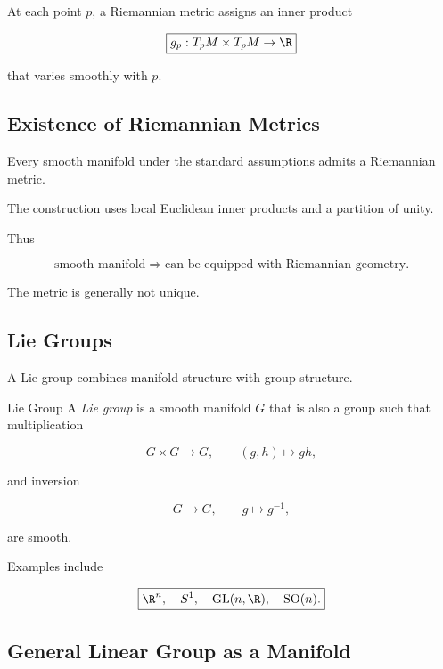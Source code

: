 At each point \(p\), a Riemannian metric assigns an inner product

\[
\boxed{
g_p:T_pM\times T_pM\to\R
}
\]

that varies smoothly with \(p\).

\subsection{Existence of Riemannian Metrics}
\label{subsec:existence-riemannian-metrics}

Every smooth manifold under the standard assumptions admits a Riemannian
metric.

The construction uses local Euclidean inner products and a partition of
unity.

Thus

\[
\boxed{
\text{smooth manifold}
\Longrightarrow
\text{can be equipped with Riemannian geometry}.
}
\]

The metric is generally not unique.

\subsection{Lie Groups}
\label{subsec:lie-groups-manifolds}

A Lie group combines manifold structure with group structure.

\begin{definitionbox}{Lie Group}
A \emph{Lie group} is a smooth manifold \(G\) that is also a group such that
multiplication

\[
\boxed{
G\times G\to G,
\qquad
(g,h)\mapsto gh,
}
\]

and inversion

\[
\boxed{
G\to G,
\qquad
g\mapsto g^{-1},
}
\]

are smooth.
\end{definitionbox}

Examples include

\[
\boxed{
\R^n,
\quad
S^1,
\quad
\mathrm{GL}(n,\R),
\quad
\mathrm{SO}(n).
}
\]

\subsection{General Linear Group as a Manifold}
\label{subsec:general-linear-manifold}

